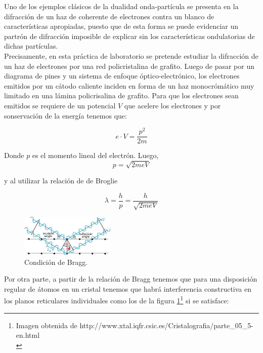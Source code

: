 \documentclass[prb,aps,twocolumn,preprintnumbers,amsmath,amssymb]{revtex4}
\begin{document}
Uno de los ejemplos clásicos de la dualidad onda-partícula se presenta en la difracción de un haz de coherente de electrones contra un blanco de características apropiadas, puesto que de esta forma se puede evidenciar un partrón de difracción imposible de explicar sin los características ondulatorias de dichas partículas.\\

Precisamente, en esta práctica de laboratorio se pretende estudiar la difracción de un haz de electrones por una red policristalina de grafito. Luego de pasar por un diagrama de pines y un sistema de enfoque óptico-electrónico, los electrones emitidos por un cátodo caliente inciden en forma de un haz monocrómático muy limitado en una lámina policrisalina de grafito. Para que los electrones sean emitidos se requiere de un potencial $V$ que acelere los electrones y por sonservación de la energía tenemos que:
 
\begin{equation}
\label{conservation}
e \cdot V = \frac{p^{2}}{2m}
\end{equation}

Donde $p$ es el momento lineal del electrón. Luego,\\

\begin{equation}
\label{momento}
p = \sqrt{2meV}
\end{equation}

y al utilizar la relación de de Broglie

\begin{equation}
\label{broglie}
\lambda = \frac{h}{p} = \frac{h}{\sqrt{2meV}}
\end{equation}

\begin{figure}[h!]
	\centering
	\includegraphics[width=0.4\textwidth]{bragg}
	\caption{ Condición de Bragg. }
	\label{fig: bragg}
\end{figure}

Por otra parte, a partir de la relación de Bragg tenemos que para una disposición regular de átomos en un cristal tenemos que habrá interferencia constructiva en los planos reticulares individuales como los de la figura \ref{fig: bragg}\footnote{Imagen obtenida de http://www.xtal.iqfr.csic.es/Cristalografia/parte\_05\_5-en.html\\} si se satisface:
\end{document}
